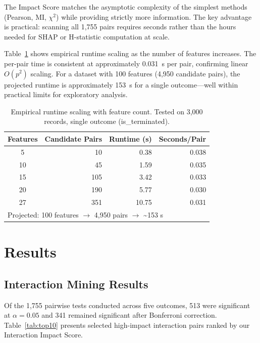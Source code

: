 \documentclass[conference]{IEEEtran}
\begin{document}
The Impact Score matches the asymptotic complexity of the simplest methods (Pearson, MI, $\chi^2$) while providing strictly more information. The key advantage is practical: scanning all 1,755 pairs requires seconds rather than the hours needed for SHAP or H-statistic computation at scale.

Table~\ref{tab:scalability} shows empirical runtime scaling as the number of features increases. The per-pair time is consistent at approximately 0.031~s per pair, confirming linear $O(p^2)$ scaling. For a dataset with 100 features (4,950 candidate pairs), the projected runtime is approximately 153~s for a single outcome---well within practical limits for exploratory analysis.

\begin{table}[htb]
\centering
\small
\renewcommand{\arraystretch}{1.15}
\caption{Empirical runtime scaling with feature count. Tested on 3,000 records, single outcome (is\_terminated).}
\label{tab:scalability}
\begin{tabular}{crrr}
\hline
Features & Candidate Pairs & Runtime (s) & Seconds/Pair \\
\hline
5 & 10 & 0.38 & 0.038 \\
10 & 45 & 1.59 & 0.035 \\
15 & 105 & 3.42 & 0.033 \\
20 & 190 & 5.77 & 0.030 \\
27 & 351 & 10.75 & 0.031 \\
\hline
\multicolumn{4}{l}{\small Projected: 100 features $\to$ 4,950 pairs $\to$ {\textasciitilde}153 s} \\
\end{tabular}
\end{table}
\section{Results}
\label{sec:results}

\subsection{Interaction Mining Results}

Of the 1,755 pairwise tests conducted across five outcomes, 513 were significant at $\alpha = 0.05$ and 341 remained significant after Bonferroni correction. Table~\ref{tab:top10} presents selected high-impact interaction pairs ranked by our Interaction Impact Score.
\end{document}
